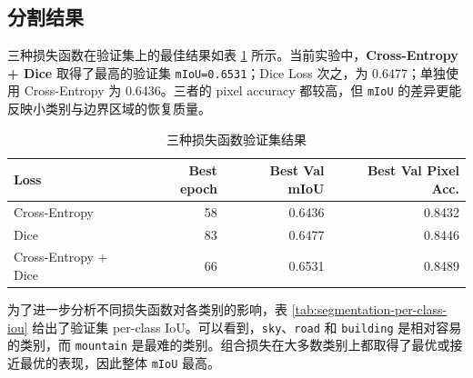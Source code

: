 \documentclass[UTF8,a4paper,11pt]{ctexart}
\newcommand{\code}[1]{\texttt{#1}}
\begin{document}
\subsection{分割结果}

三种损失函数在验证集上的最佳结果如表 \ref{tab:segmentation-loss-results} 所示。当前实验中，\textbf{Cross-Entropy + Dice} 取得了最高的验证集 \code{mIoU=0.6531}；Dice Loss 次之，为 0.6477；单独使用 Cross-Entropy 为 0.6436。三者的 pixel accuracy 都较高，但 \code{mIoU} 的差异更能反映小类别与边界区域的恢复质量。

\begin{table}[H]
    \centering
    \caption{三种损失函数验证集结果}
    \label{tab:segmentation-loss-results}
    \small
    \begin{tabular}{lrrr}
        \toprule
        Loss & Best epoch & Best Val mIoU & Best Val Pixel Acc. \\
        \midrule
        Cross-Entropy & 58 & 0.6436 & 0.8432 \\
        Dice & 83 & 0.6477 & 0.8446 \\
        Cross-Entropy + Dice & 66 & 0.6531 & 0.8489 \\
        \bottomrule
    \end{tabular}
\end{table}

为了进一步分析不同损失函数对各类别的影响，表 \ref{tab:segmentation-per-class-iou} 给出了验证集 per-class IoU。可以看到，\code{sky}、\code{road} 和 \code{building} 是相对容易的类别，而 \code{mountain} 是最难的类别。组合损失在大多数类别上都取得了最优或接近最优的表现，因此整体 \code{mIoU} 最高。

\begin{table}[H]
    \centering
    \caption{三种损失函数的 per-class IoU}
    \label{tab:segmentation-per-class-iou}
    \scriptsize
\end{table}
\end{document}
